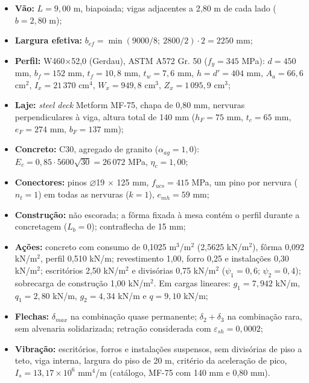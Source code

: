 \begin{itemize}
\item \textbf{Vão:} $L = 9{,}00$ m, biapoiada; vigas adjacentes a 2,80 m de cada lado ($b = 2{,}80$ m);
\item \textbf{Largura efetiva:} $b_{ef} = \min(9000/8;\ 2800/2) \cdot 2 = 2250$ mm;
\item \textbf{Perfil:} W460\ensuremath{\times}52,0 (Gerdau), ASTM A572 Gr. 50 ($f_y = 345$ MPa): $d = 450$ mm, $b_f = 152$ mm, $t_f = 10{,}8$ mm, $t_w = 7{,}6$ mm, $h = d' = 404$ mm, $A_a = 66{,}6$ cm\ensuremath{^2}, $I_x = 21\,370$ cm\ensuremath{^4}, $W_x = 949{,}8$ cm\ensuremath{^3}, $Z_x = 1\,095{,}9$ cm\ensuremath{^3};
\item \textbf{Laje:} \emph{steel deck} Metform MF-75, chapa de 0,80 mm, nervuras perpendiculares à viga, altura total de 140 mm ($h_F = 75$ mm, $t_c = 65$ mm, $e_F = 274$ mm, $b_F = 137$ mm);
\item \textbf{Concreto:} C30, agregado de granito ($\alpha_{ag} = 1{,}0$): $E_c = 0{,}85 \cdot 5600\sqrt{30} = 26\,072$ MPa, $\eta_c = 1{,}00$;
\item \textbf{Conectores:} pinos \ensuremath{\varnothing}19 \ensuremath{\times} 125 mm, $f_{ucs} = 415$ MPa, um pino por nervura ($n_t = 1$) em todas as nervuras ($k = 1$), $e_{mh} = 59$ mm;
\item \textbf{Construção:} não escorada; a fôrma fixada à mesa contém o perfil durante a concretagem ($L_b = 0$); contraflecha de 15 mm;
\item \textbf{Ações:} concreto com consumo de 0,1025 m\ensuremath{^3}/m\ensuremath{^2} (2,5625 kN/m\ensuremath{^2}), fôrma 0,092 kN/m\ensuremath{^2}, perfil 0,510 kN/m; revestimento 1,00, forro 0,25 e instalações 0,30 kN/m\ensuremath{^2}; escritórios 2,50 kN/m\ensuremath{^2} e divisórias 0,75 kN/m\ensuremath{^2} ($\psi_1 = 0{,}6$; $\psi_2 = 0{,}4$); sobrecarga de construção 1,00 kN/m\ensuremath{^2}. Em cargas lineares: $g_1 = 7{,}942$ kN/m, $q_1 = 2{,}80$ kN/m, $g_2 = 4{,}34$ kN/m e $q = 9{,}10$ kN/m;
\item \textbf{Flechas:} $\delta_{max}$ na combinação quase permanente; $\delta_2 + \delta_3$ na combinação rara, sem alvenaria solidarizada; retração considerada com $\varepsilon_{sh} = 0{,}0002$;
\item \textbf{Vibração:} escritórios, forros e instalações suspensos, sem divisórias de piso a teto, viga interna, largura do piso de 20 m, critério da aceleração de pico, $I_s = 13{,}17 \times 10^6$ mm\ensuremath{^4}/m (catálogo, MF-75 com 140 mm e 0,80 mm).
\end{itemize}

